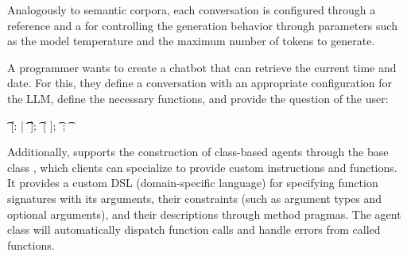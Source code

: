 Analogously to semantic corpora, each conversation is configured through a  reference and a  for controlling the generation behavior through parameters such as the model temperature and the maximum number of tokens to generate.

\begin{example}
	A programmer wants to create a chatbot that can retrieve the current time and date.
	For this, they define a conversation with an appropriate configuration for the LLM, define the necessary functions, and provide the question of the user:

	\begin{multicode}
		  \n
		\t	{} [: | \n
		\t	\t	{}  ]; \n
		\t	{}   [ ]; \n
		\t	{} ; \n
		\t	{} 
	\end{multicode}
\end{example}

Additionally, \semtex supports the construction of class-based agents through the base class , which clients can specialize to provide custom instructions and functions.
It provides a custom DSL (domain-specific language) for specifying function signatures with its arguments, their constraints (such as argument types and optional arguments), and their descriptions through method pragmas.
The agent class will automatically dispatch function calls and handle errors from called functions.


